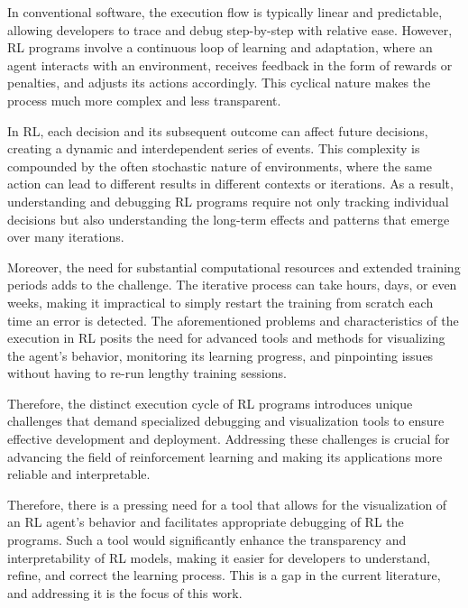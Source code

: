 In conventional software, the execution flow is typically linear and predictable, 
allowing developers to trace and debug step-by-step with relative ease. However, 
\ac{RL} programs involve a continuous loop of learning and adaptation, where an agent 
interacts with an environment, receives feedback in the form of rewards or 
penalties, and adjusts its actions accordingly. This cyclical nature makes the 
process much more complex and less transparent.

In \ac{RL}, each decision and its subsequent outcome can affect future decisions, 
creating a dynamic and interdependent series of events. This complexity is 
compounded by the often stochastic nature of environments, where the same action 
can lead to different results in different contexts or iterations. As a result, 
understanding and debugging \ac{RL} programs require not only tracking individual 
decisions but also understanding the long-term effects and patterns that emerge 
over many iterations.

Moreover, the need for substantial computational resources and extended training 
periods adds to the challenge. The iterative process can take hours, days, or 
even weeks, making it impractical to simply restart the training from scratch 
each time an error is detected. The aforementioned problems and characteristics
of the execution in \ac{RL} posits the need for advanced tools and methods 
for visualizing the agent's behavior, monitoring its learning progress, and 
pinpointing issues without having to re-run lengthy training sessions.

Therefore, the distinct execution cycle of \ac{RL} programs introduces unique 
challenges that demand specialized debugging and visualization tools to ensure 
effective development and deployment. Addressing these challenges is crucial 
for advancing the field of reinforcement learning and making its applications 
more reliable and interpretable.

Therefore, there is a pressing need for a tool that allows for the visualization 
of an \ac{RL} agent's behavior and facilitates appropriate debugging of \ac{RL} the programs. 
Such a tool would significantly enhance the transparency and interpretability 
of \ac{RL} models, making it easier for developers to understand, refine, and correct 
the learning process. This is a gap in the current literature, and addressing it 
is the focus of this work.

